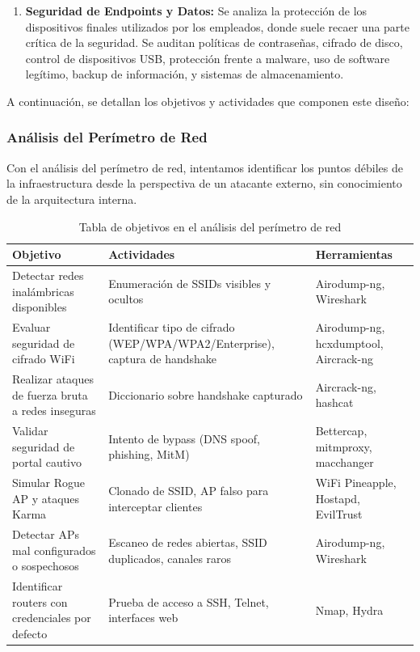 \documentclass[a4paper, 11pt]{article}
\begin{document}
\begin{enumerate}
\item \textbf{Seguridad de Endpoints y Datos:} Se analiza la protección de los dispositivos finales utilizados por los empleados, donde suele recaer una parte crítica de la seguridad. Se auditan políticas de contraseñas, cifrado de disco, control de dispositivos USB, protección frente a malware, uso de software legítimo, backup de información, y sistemas de almacenamiento.

\end{enumerate}

A continuación, se detallan los objetivos y actividades que componen este diseño:

\subsubsection{Análisis del Perímetro de Red}

Con el análisis del perímetro de red, intentamos identificar los puntos débiles de la infraestructura desde la perspectiva de un atacante externo, sin conocimiento de la arquitectura interna.

\begin{table}[H]
    \centering
    \renewcommand{\arraystretch}{1.4}
    \begin{tabular}{|p{4.5cm}|p{6.5cm}|p{4.4cm}|}
    \hline
    \textbf{Objetivo} & \textbf{Actividades} & \textbf{Herramientas}\\
    \hline
    Detectar redes inalámbricas disponibles & Enumeración de SSIDs visibles y ocultos & Airodump-ng, Wireshark\\
    \hline
    Evaluar seguridad de cifrado WiFi & Identificar tipo de cifrado (WEP/WPA/WPA2/Enterprise), captura de handshake & Airodump-ng, hcxdumptool, Aircrack-ng\\
    \hline
    Realizar ataques de fuerza bruta a redes inseguras & Diccionario sobre handshake capturado & Aircrack-ng, hashcat\\
    \hline
    Validar seguridad de portal cautivo & Intento de bypass (DNS spoof, phishing, MitM) & Bettercap, mitmproxy, macchanger\\
    \hline
    Simular Rogue AP y ataques Karma & Clonado de SSID, AP falso para interceptar clientes & WiFi Pineapple, Hostapd, EvilTrust\\
    \hline
    Detectar APs mal configurados o sospechosos & Escaneo de redes abiertas, SSID duplicados, canales raros & Airodump-ng, Wireshark\\
    \hline
    Identificar routers con credenciales por defecto & Prueba de acceso a SSH, Telnet, interfaces web & Nmap, Hydra\\
    \hline
    \end{tabular}
    \caption{Tabla de objetivos en el análisis del perímetro de red}
\end{table}
\end{document}

